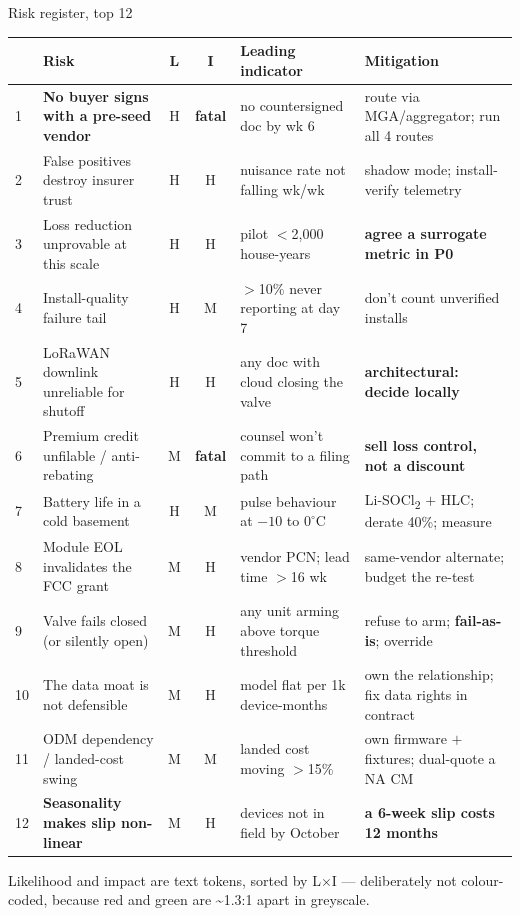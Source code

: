 \documentclass[aspectratio=169,t,10pt,xcolor={table,svgnames}]{beamer}
\newcommand{\hd}[1]{\textbf{\footnotesize #1}}
\begin{document}
\begin{frame}{Risk register, top 12}
  \scriptsize
  \begin{tabular}{@{}p{}p{}cc p{}p{}@{}}
    \toprule
    & \hd{Risk} & \hd{L} & \hd{I} & \hd{Leading indicator} & \hd{Mitigation} \\
    \midrule
    1&\textbf{No buyer signs with a pre-seed vendor} & H & \cellcolor{fill3}\textbf{fatal} & no countersigned doc by wk 6 & route via MGA/aggregator; run all 4 routes \\
    2&False positives destroy insurer trust & H & H & nuisance rate not falling wk/wk & shadow mode; install-verify telemetry \\
    3&Loss reduction unprovable at this scale & H & H & pilot $<$2{,}000 house-years & \textbf{agree a surrogate metric in P0} \\
    4&Install-quality failure tail & H & M & $>$10\% never reporting at day 7 & don't count unverified installs \\
    5&LoRaWAN downlink unreliable for shutoff & H & H & any doc with cloud closing the valve & \textbf{architectural: decide locally} \\
    6&Premium credit unfilable / anti-rebating & M & \cellcolor{fill3}\textbf{fatal} & counsel won't commit to a filing path & \textbf{sell loss control, not a discount} \\
    7&Battery life in a cold basement & H & M & pulse behaviour at $-10$ to $0^{\circ}$C & Li-SOCl\textsubscript{2} $+$ HLC; derate 40\%; measure \\
    8&Module EOL invalidates the FCC grant & M & H & vendor PCN; lead time $>$16 wk & same-vendor alternate; budget the re-test \\
    9&Valve fails closed (or silently open) & M & H & any unit arming above torque threshold & refuse to arm; \textbf{fail-as-is}; override \\
    10&The data moat is not defensible & M & H & model flat per 1k device-months & own the relationship; fix data rights in contract \\
    11&ODM dependency / landed-cost swing & M & M & landed cost moving $>$15\% & own firmware $+$ fixtures; dual-quote a NA CM \\
    12&\textbf{Seasonality makes slip non-linear} & M & H & devices not in field by October & \textbf{a 6-week slip costs 12 months} \\
    \bottomrule
  \end{tabular}
  \vspace{0.4em}
  {\scriptsize\color{inkmute} Likelihood and impact are text tokens, sorted by L$\times$I ---
   deliberately not colour-coded, because red and green are \textasciitilde1.3:1 apart in greyscale.\par}
\end{frame}
\end{document}
